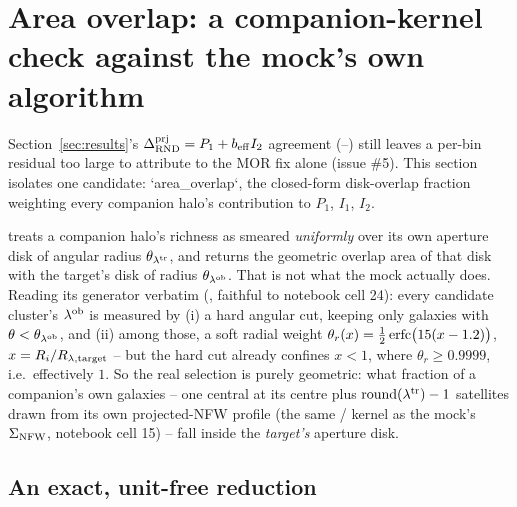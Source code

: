 \section{Area overlap: a companion-kernel check against the mock's own
algorithm}
\label{sec:area_overlap}

Section~\ref{sec:results}'s $\Delta^{\rm prj}_{\rm RND} = P_1 + b_{\rm eff} I_2$
agreement (\DeltaPrjAgreeMin{}--\DeltaPrjAgreeMax{}) still leaves a
per-bin residual too large to attribute to the MOR fix alone (issue \#5).
This section isolates one candidate: `area\_overlap`, the closed-form
disk-overlap fraction weighting every companion halo's contribution to
$P_1$, $I_1$, $I_2$.

 treats a companion halo's richness as smeared
\emph{uniformly} over its own aperture disk of angular radius
$\theta_{\lambda^{\rm tr}}$, and returns the geometric overlap area of that disk with
the target's disk of radius $\theta_{\lambda^{\rm ob}}$. That is not what the mock
actually does. Reading its generator verbatim
(,
faithful to notebook cell 24): every candidate cluster's
$\lambda^{\rm ob}$ is measured by (i) a hard angular cut, keeping only
galaxies with $\theta < \theta_{\lambda^{\rm ob}}$, and (ii) among those, a soft
radial weight $\theta_r(x) = \tfrac12\,{\rm erfc}\big(15(x-1.2)\big)$,
$x = R_i/R_{\lambda,{\rm target}}$ -- but the hard cut already confines
$x < 1$, where $\theta_r \ge 0.9999$, i.e.\ effectively $1$. So the real
selection is purely geometric: what fraction of a companion's own
galaxies -- one central at its centre plus
$\mathrm{round}(\lambda^{\rm tr}) - 1$ satellites drawn from its own projected-NFW
profile (the same / kernel as the mock's
$\Sigma_{\rm NFW}$, notebook cell 15) -- fall inside the \emph{target's}
aperture disk.

\subsection{An exact, unit-free reduction}


